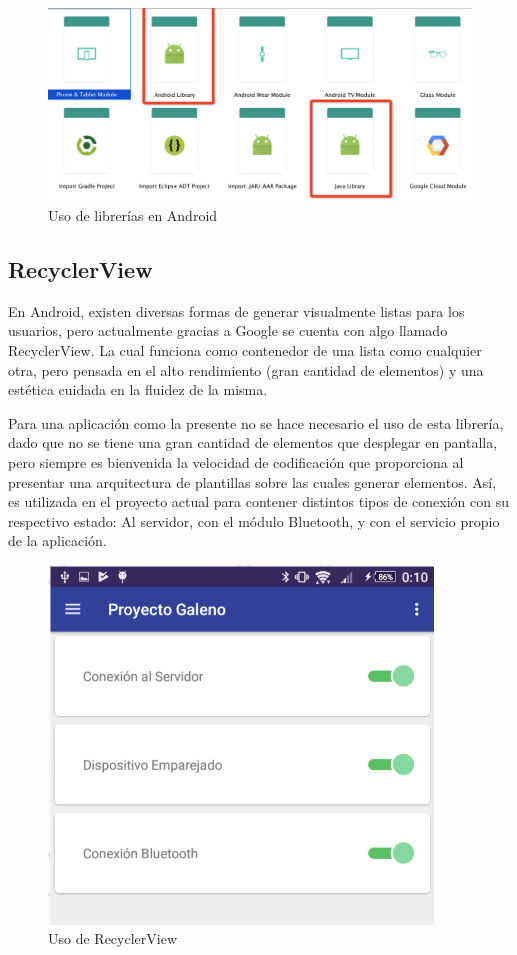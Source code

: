 \begin{figure}[H]
	\centering
	\includegraphics[scale=0.3]{figuras/proto1/library.png}
	\caption{Uso de librerías en Android}
	\label{library}
\end{figure}

 \newpage

\subsection{RecyclerView}

En Android, existen diversas formas de generar visualmente listas para los usuarios, pero actualmente gracias a Google se cuenta con algo llamado RecyclerView. La cual funciona como contenedor de una lista como cualquier otra, pero pensada en el alto rendimiento (gran cantidad de elementos) y una estética cuidada en la fluidez de la misma. 

Para una aplicación como la presente no se hace necesario el uso de esta librería, dado que no se tiene una gran cantidad de elementos que desplegar en pantalla, pero siempre es bienvenida la velocidad de codificación que proporciona al presentar una arquitectura de plantillas sobre las cuales generar elementos. Así, es utilizada en el proyecto actual para contener distintos tipos de conexión  con su respectivo estado: Al servidor, con el módulo Bluetooth, y con el servicio propio de la aplicación.\newline

\begin{figure}[H]
	\centering
	\includegraphics[scale=1]{figuras/proto1/recycler.png}
	\caption{Uso de RecyclerView}
	\label{recycler}
\end{figure} 

